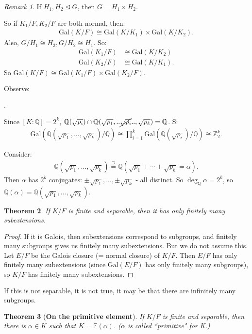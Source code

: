 \documentclass[9pt,reqno,twoside]{amsbook}
\theoremstyle{plain}
\newtheorem{theorem}{Theorem}[chapter]
\numberwithin{section}{chapter}
\numberwithin{equation}{chapter}
\theoremstyle{definition}
\theoremstyle{remark}
\newtheorem{rem}[theorem]{Remark}
\theoremstyle{plain}
\newcommand{\norm}{\trianglelefteq}
\newcommand{\z}{\mathbb{Z}}
\newcommand{\Q}{\mathbb{Q}}
\newcommand{\F}{\mathbb{F}}
\newcommand{\bee}{\begin{equation}\begin{aligned}}
\newcommand{\eee}{\end{aligned}\end{equation}}
\newcommand{\lpar}{\left(}
\newcommand{\rpar}{\right)}
\newcommand{\gal}{\mathrm{Gal}}
\newcommand{\qwe}{\sqrt}
\begin{document}
\begin{rem}
If $H_1,H_2 \norm G$, then $G = H_1 \times H_2$. 


So if $K_1/F,K_2/F$ are both normal, then:
\bee
\gal(K/F) \cong \gal(K/K_1)\times \gal(K/K_2).
\eee
Also, $G/H_1 \cong H_2,G/H_2 \cong H_1$. So:
\bee
\gal(K_1/F)& \cong \gal(K/K_2)\\
\gal(K_2/F)& \cong \gal(K/K_1).
\eee
So $\gal(K/F) \cong \gal(K_1/F) \times \gal(K_2/F)$. 
\end{rem}

Observe:
\begin{center}
.
\end{center}
Since $[K:\Q] = 2^k$, $\Q(\qwe{p_i}) \cap \Q(\qwe{p_1},..\cancel{\qwe{p_i}}..,\qwe{p_k}) = \Q$. S:
 \bee
 \gal(\Q(\qwe{p_1},...,\qwe{p_k})/\Q) \cong \prod_{i = 1}^k \gal(\Q(\qwe{p_i})/\Q)\cong \z_2^k.
 \eee
 
 Consider:
 \bee
 \Q(\qwe{p_1},...,\qwe{p_k}) \overset{\supseteq}{=} \Q(\qwe{p_1}+ \cdots + \qwe{p_k} = \alpha).
 \eee
 Then $\alpha$ has $2^k$ conjugates: $\pm \qwe{p_1},...,\pm \qwe{p_k}$ - all distinct. So $\deg_{\Q}\alpha = 2^k$, so $\Q(\alpha) = \Q(\qwe{p_1},...,\qwe{p_k})$. 
 
 \begin{theorem}
 If $K/F$ is finite and separable, then it has only finitely many subextensions. 
 \end{theorem}
 
 \begin{proof}
 If it is Galois, then subextensions correspond to subgroups, and finitely many subgroups gives us finitely many subextensions. But we do not assume this. Let $E/F$ be the Galois closure (= normal closure) of $K/F$. Then $E/F$ has only finitely many subextensions (since $\gal(E/F)$ has only finitely many subgroups), so $K/F$ has finitely many subextensions. 
 \end{proof}
 
 If this is not separable, it is not true, it may be that there are infinitely many subgroups. 
 

 
 \begin{theorem}[\textbf{On the primitive element}]
 If $K/F$ is finite and separable, then there is $\alpha \in K$ such that $K = \F(\alpha)$. ($\alpha$ is called ``primitive" for K.)
 \end{theorem}
 
\end{document}
